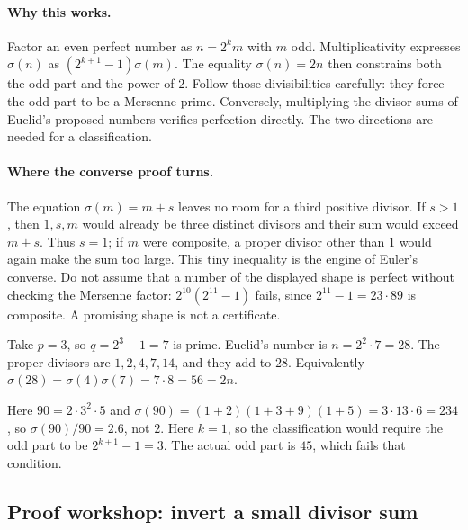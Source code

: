 \paragraph{Why this works.}
Factor an even perfect number as $n=2^km$ with $m$ odd. Multiplicativity expresses $\sigma(n)$ as $(2^{k+1}-1)\sigma(m)$. The equality $\sigma(n)=2n$ then constrains both the odd part and the power of $2$. Follow those divisibilities carefully: they force the odd part to be a Mersenne prime. Conversely, multiplying the divisor sums of Euclid's proposed numbers verifies perfection directly. The two directions are needed for a classification.

\paragraph{Where the converse proof turns.}
The equation $\sigma(m)=m+s$ leaves no room for a third positive divisor.
If $s>1$, then $1,s,m$ would already be three distinct divisors and their sum
would exceed $m+s$. Thus $s=1$; if $m$ were composite, a proper divisor other
than $1$ would again make the sum too large. This tiny inequality is the
engine of Euler's converse. Do not assume that a number of the displayed shape
is perfect without checking the Mersenne factor: $2^{10}(2^{11}-1)$ fails,
since $2^{11}-1=23\cdot89$ is composite. A promising shape is not a certificate.

\begin{examplex}
Take $p=3$, so $q=2^3-1=7$ is prime. Euclid's number is $n=2^{2}\cdot 7=28$.
The proper divisors are $1,2,4,7,14$, and they add to $28$.
Equivalently $\sigma(28)=\sigma(4)\sigma(7)=7\cdot 8=56=2n$.
\end{examplex}

\begin{examplex}
Here $90=2\cdot 3^2\cdot 5$ and $\sigma(90)=(1+2)(1+3+9)(1+5)=3\cdot 13\cdot 6=234$, so $\sigma(90)/90=2.6$, not $2$.
Here $k=1$, so the classification would require the odd part to be
$2^{k+1}-1=3$. The actual odd part is $45$, which fails that condition.
\end{examplex}

\subsection*{Proof workshop: invert a small divisor sum}

